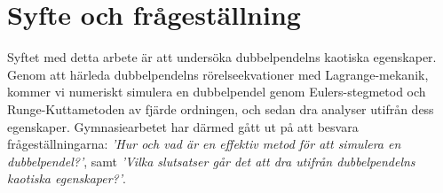 





\section{Syfte och frågeställning}
Syftet med detta arbete är att undersöka dubbelpendelns kaotiska egenskaper. Genom att härleda dubbelpendelns rörelseekvationer med Lagrange-mekanik, kommer vi numeriskt simulera en dubbelpendel genom Eulers-stegmetod och Runge-Kuttametoden av fjärde ordningen, och sedan dra analyser utifrån dess egenskaper. Gymnasiearbetet har därmed gått ut på att besvara frågeställningarna: \emph{'Hur och vad är en effektiv metod för att simulera en dubbelpendel?'}, samt \emph{'Vilka slutsatser går det att dra utifrån dubbelpendelns kaotiska egenskaper?'}. 

